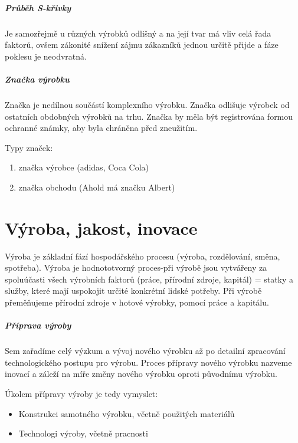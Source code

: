 \documentclass[11pt,a4paper,twoside]{book}
\begin{document}
	\paragraph*{Průběh S-křivky}
	Je samozřejmě u různých výrobků odlišný a na její tvar má vliv celá řada faktorů, ovšem zákonité snížení zájmu zákazníků jednou určitě přijde a fáze poklesu je neodvratná.

	\paragraph*{Značka výrobku}
	Značka je nedílnou součástí komplexního výrobku. Značka odlišuje výrobek od ostatních obdobných výrobků na trhu. Značka by měla být registrována formou ochranné známky, aby byla chráněna před zneužitím.

	Typy značek:
	\begin{enumerate}
		\item značka výrobce (adidas, Coca Cola)
		\item značka obchodu (Ahold má značku Albert)
	\end{enumerate}

	\chapter{Výroba, jakost, inovace}

	Výroba je základní fází hospodářského procesu (výroba, rozdělování, směna, spotřeba). Výroba je hodnototvorný proces-při výrobě jsou vytvářeny za spoluúčasti všech výrobních faktorů (práce, přírodní zdroje, kapitál) = statky a služby, které mají uspokojit určité konkrétní lidské potřeby. Při výrobě přeměňujeme přírodní zdroje v hotové výrobky, pomocí práce a kapitálu.

	\paragraph*{Příprava výroby}
	Sem zařadíme celý výzkum a vývoj nového výrobku až po detailní zpracování technologického postupu pro výrobu. Proces přípravy nového výrobku nazveme inovací a záleží na míře změny nového výrobku oproti původnímu výrobku.

	Úkolem přípravy výroby je tedy vymyslet:
	\begin{itemize}
		\item Konstrukci samotného výrobku, včetně použitých materiálů
		\item Technologi výroby, včetně pracnosti
	\end{itemize}
\end{document}
